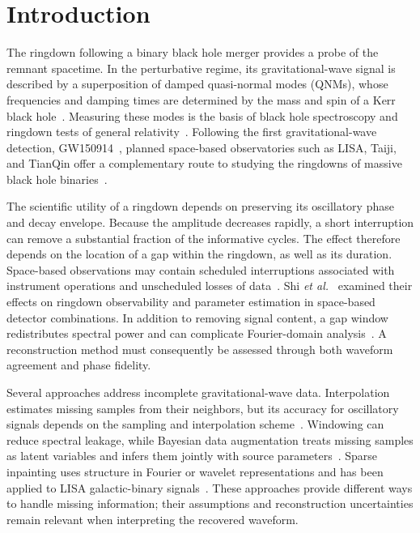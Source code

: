 \documentclass[prd,aps,a4paper,twocolumn,superscriptaddress,nofootinbib,floatfix]{revtex4-2}
\begin{document}
\maketitle
    



\section{Introduction}

The ringdown following a binary black hole merger provides a probe of the remnant spacetime. In the perturbative regime, its gravitational-wave signal is described by a superposition of damped quasi-normal modes (QNMs), whose frequencies and damping times are determined by the mass and spin of a Kerr black hole~\cite{berti2006gravitational,berti2009qnm}. Measuring these modes is the basis of black hole spectroscopy and ringdown tests of general relativity~\cite{Isi_2019}. Following the first gravitational-wave detection, GW150914~\cite{abbott2016observation,Abbott_2016}, planned space-based observatories such as LISA, Taiji, and TianQin offer a complementary route to studying the ringdowns of massive black hole binaries~\cite{amaroseoane2017laserinterferometerspaceantenna,robson2019construction,Ruan2020,Luo2016}.

The scientific utility of a ringdown depends on preserving its oscillatory phase and decay envelope. Because the amplitude decreases rapidly, a short interruption can remove a substantial fraction of the informative cycles. The effect therefore depends on the location of a gap within the ringdown, as well as its duration. Space-based observations may contain scheduled interruptions associated with instrument operations and unscheduled losses of data~\cite{baghi2019gaps,dey2021gaps,Spadaro:2023hlw}. Shi \textit{et al.}~\cite{shi2024effectsdatagapsringdown} examined their effects on ringdown observability and parameter estimation in space-based detector combinations. In addition to removing signal content, a gap window redistributes spectral power and can complicate Fourier-domain analysis~\cite{Harris1978}. A reconstruction method must consequently be assessed through both waveform agreement and phase fidelity.

Several approaches address incomplete gravitational-wave data. Interpolation estimates missing samples from their neighbors, but its accuracy for oscillatory signals depends on the sampling and interpolation scheme~\cite{Horowitz1974,Maeland1988,Unser1999}. Windowing can reduce spectral leakage, while Bayesian data augmentation treats missing samples as latent variables and infers them jointly with source parameters~\cite{Harris1978,Baghi2019}. Sparse inpainting uses structure in Fourier or wavelet representations and has been applied to LISA galactic-binary signals~\cite{Blelly2021,Starck2010}. These approaches provide different ways to handle missing information; their assumptions and reconstruction uncertainties remain relevant when interpreting the recovered waveform.
\end{document}
